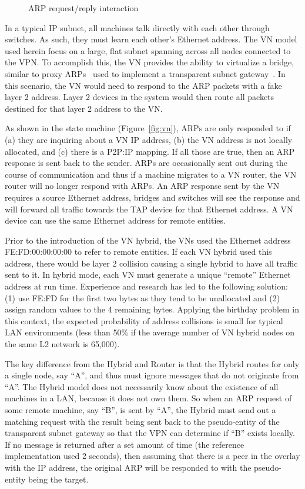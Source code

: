 \begin{figure}
\centering
{}
\caption{ARP request/reply interaction}
\label{fig:arp}
\end{figure}

In a typical IP subnet, all machines talk directly with each other through
switches.  As such, they must learn each other's Ethernet address. The VN model
used herein focus on a large, flat subnet spanning across all nodes connected
to the VPN.  To accomplish this, the VN provides the ability to virtualize a
bridge, similar to proxy ARPs~\cite{RFC0925} used to implement a transparent
subnet gateway~\cite{RFC1027}.  In this scenario, the VN would need to respond
to the ARP packets with a fake layer 2 address.  Layer 2 devices in the system
would then route all packets destined for that layer 2 address to the VN.

As shown in the state machine (Figure~\ref{fig:vn}), ARPs are only responded to
if (a) they are inquiring about a VN IP address, (b) the VN address is not
locally allocated, and (c) there is a P2P:IP mapping.  If all those are true,
then an ARP response is sent back to the sender.  ARPs are occasionally sent
out during the course of communication and thus if a machine migrates to a VN
router, the VN router will no longer respond with ARPs.  An ARP response sent
by the VN requires a source Ethernet address, bridges and switches will see the
response and will forward all traffic towards the TAP device for that Ethernet
address.  A VN device can use the same Ethernet address for remote entities.

Prior to the introduction of the VN hybrid, the VNs used the Ethernet address
FE:FD:00:00:00:00 to refer to remote entities.  If each VN hybrid used this
address, there would be layer 2 collision causing a single hybrid to have all
traffic sent to it.  In hybrid mode, each VN must generate a unique ``remote''
Ethernet address at run time.  Experience and research has led to the
following solution: (1) use FE:FD for the first two bytes as they tend to be
unallocated and (2) assign random values to the 4 remaining bytes.   Applying
the birthday problem in this context, the expected probability of address
collisions is small for typical LAN environments (less than 50\% if the average
number of VN hybrid nodes on the same L2 network is 65,000). 

The key difference from the Hybrid and Router is that the Hybrid routes for only
a single node, say ``A'', and thus must ignore messages that do not originate
from ``A''.  The Hybrid model does not necessarily know about the existence of
all machines in a LAN, because it does not own them.  So when an ARP request
of some remote machine, say ``B'', is sent by ``A'', the Hybrid must send out
a matching request with the result being sent back to the pseudo-entity of the
transparent subnet gateway so that the VPN can determine if ``B'' exists
locally.  If no message is returned after a set amount of time (the reference
implementation used 2 seconds), then assuming that there is a peer in the
overlay with the IP address, the original ARP will be responded to with the
pseudo-entity being the target.

